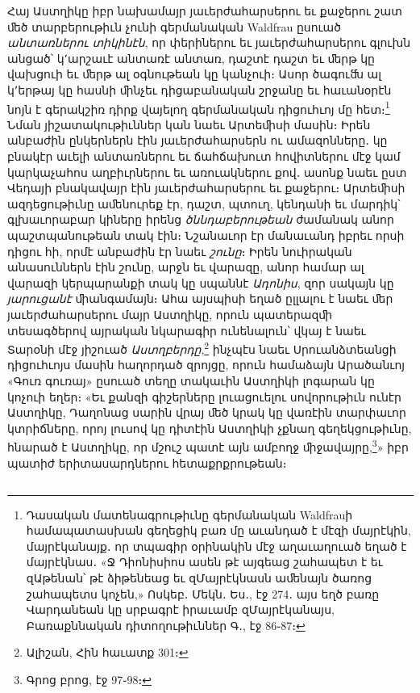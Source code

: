 \documentclass{article}
\begin{document}
{Հայ Աստղիկը իբր նախամայր յաւերժահարսերու եւ քաջերու շատ ﬔծ տարբերութիւն չունի գերմանական Waldfrau ըսուած \emph{անտառներու տիկինէն}, որ փերիներու եւ յաւերժահարսերու գլուխն անցած՝ կ՚արշաւէ անտառէ անտառ, դաշտէ դաշտ եւ ﬔրթ կը վախցուի եւ ﬔրթ ալ օգնութեան կը կանչուի։ Ասոր ծագուﬓ ալ կ՚երթայ կը հասնի ﬕնչեւ դիցաբանական շրջանը եւ հաւանօրէն նոյն է գերակշիռ դիրք վայելող գերմանական դիցուհւոյ մը հետ։\footnote{Դասական մատենագրութիւնը գերմանական Waldfrauի համապատասխան գեղեցիկ բառ մը աւանդած է մէզի մայրէկին, մայրէկանայք․ որ տպագիր օրինակին մէջ աղաւաղուած եղած է մայրէկնաս․ «Ջ Դիոնիսիոս ասեն թէ այգեաց շահապետ է եւ զԱթենան՝ թէ ձիթենեաց եւ զՄայրէկնասն աﬔնայն ծառոց շահապետս կոչեն,» Ոսկեբ․ Մեկն․ Ես․, էջ 274․ այս եղծ բառը Վարդանեան կը սրբագրէ իրաւամբ զՄայրէկանայս, Բառաքննական դիտողութիւններ Գ․, էջ 86֊87։} Նման յիշատակութիւններ կան նաեւ Արտեﬕսի մասին։ Իրեն անբաժին ընկերներն էին յաւերժահարսերն ու ամազոնները․ կը բնակէր աւելի անտառներու եւ ճահճախուտ հովիտներու մէջ կամ կարկաչահոս աղբիւրներու եւ առուակներու քով․ ասոնք նաեւ ըստ Վեդայի բնակավայր էին յաւերժահարսերու եւ քաջերու։ Արտեﬕսի ազդեցութիւնը աﬔնուրեք էր, դաշտ, պտուղ, կենդանի եւ մարդիկ՝ գլխաւորաբար կիները իրենց \emph{ծննդաբերութեան} ժամանակ անոր պաշտպանութեան տակ էին։ Նշանաւոր էր մանաւանդ իբրեւ որսի դիցու հի, որմէ անբաժին էր նաեւ \emph{շունը}։ Իրեն նուիրական անասուններն էին շունը, արջն եւ վարազը, անոր համար ալ վարազի կերպարանքի տակ կը սպաննէ \emph{Ադոնիս}, զոր սակայն կը \emph{յարուցանէ} ﬕանգամայն։ Ահա այսպիսի եղած ըլլալու է նաեւ ﬔր յաւերժահարսերու մայր Աստղիկը, որուն պատերազﬕ տեսագծերով այրական նկարագիր ունենալուն՝ վկայ է նաեւ Տարօնի մէջ յիշուած \emph{Աստղբերդը},\footnote{Ալիշան, Հին հաւատք 301։} ինչպէս նաեւ Սրուանձտեանցի դիցուհւոյս մասին հաղորդած զրոյցը, որուն համաձայն Արածանւոյ «Գուռ գուռայ» ըսուած տեղը տակաւին Աստղիկի լոգարան կը կոչուի եղեր։ «Եւ քանզի գիշերները լուացուելու սովորութիւն ունէր Աստղիկը, Դաղոնաց սարին վրայ ﬔծ կրակ կը վառէին տարփաւոր կտրիճները, որոյ լուսով կը դիտէին Աստղիկի չքնաղ գեղեկցութիւնը, հնարած է Աստղիկը, որ մշուշ պատէ այն ամբողջ ﬕջավայրը,\footnote{Գրոց բրոց, էջ 97֊98։}» իբր պատիժ երիտասարդներու հետաքրքրութեան։}
\clearpage
\subsection{}
\end{document}
